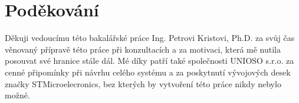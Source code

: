 \chapter*{Poděkování}
Děkuji vedoucímu této bakalářské práce Ing. Petrovi Kristovi, Ph.D. za svůj čas věnovaný přípravě této práce při konzultacích a za motivaci, která mě nutila posouvat své hranice stále dál. Mé díky patří také společnosti UNIOSO s.r.o. za cenné připomínky při návrhu celého systému a za poskytnutí vývojových desek značky STMicroelecronics, bez kterých by vytvoření této práce nikdy nebylo možné.
